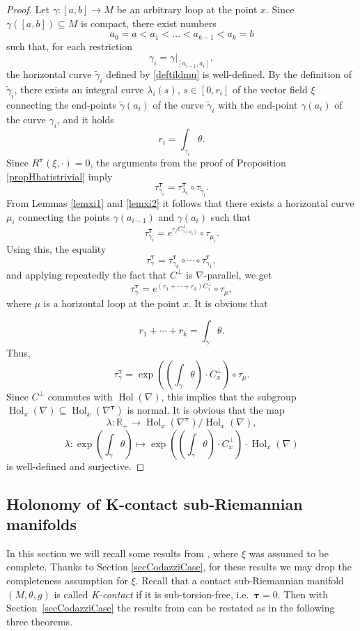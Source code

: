 \documentclass{amsart}
\theoremstyle{plain}
\theoremstyle{definition}
\newcommand{\Hol}{\operatorname{Hol}}
\newcommand{\bt}{{\boldsymbol{\tau}}}
\newcommand{\Real}{\mathbb{R}}
\newcommand{\1}{\mathbf{1}}
\newcommand{\+}{\oplus}
\newcommand{\tcom}[1]{
 \marginpar{{\scriptsize  T: #1 }}}
\newcommand{\acom}[1]{
 \marginpar{{\scriptsize A: #1 }}}
\begin{document}
\begin{proof}
Let $\gamma:[a,b]\to M$ be an arbitrary loop at the point $x$.
Since $\gamma([a,b])\subseteq M$ is compact, there exist
numbers $$a_0=a< a_1<\dots< a_{k-1}<a_k=b$$ such that,
for each restriction
$$\gamma_i=\gamma|_{[a_{i-1},a_i]},$$ the horizontal curve $\tilde \gamma_i$ defined by \eqref{deftildmu} is well-defined. 
By the definition of $\tilde\gamma_i$, there exists an integral curve $\lambda_i(s)$, $s\in [0,r_i]$ of the vector field $\xi$ connecting the end-points $\tilde\gamma(a_i)$ of the curve $\tilde\gamma_i$ with the end-point $\gamma(a_i)$ of the curve $\gamma_i$, and it holds 
$$r_i= \int_{\gamma_i}\theta.$$
Since $R^\bt(\xi,\cdot)=0$,  
the arguments from the proof of Proposition \ref{propHhatistrivial} imply
$$\tau^\bt_{\gamma_i}=\tau^\bt_{\lambda_i}\circ \tau_{\tilde\gamma_i}.$$
From Lemmas \ref{lemxi1} and \ref{lemxi2} it follows that there exists a horizontal curve $\mu_i$ connecting the points $\gamma(a_{i-1})$ and $\gamma(a_i)$ such that 
$$\tau^\bt_{\gamma_i}=e^{r_iC^\bot_{\gamma(a_i)}}\circ\tau_{\mu_i}.$$
Using this, the equality
$$\tau^\bt_\gamma=\tau^\bt_{\gamma_k}\circ\cdots\circ\tau^\bt_{\gamma_1},$$
and applying repeatedly the fact that $C^\bot$ is $\nabla$-parallel, we get 
$$\tau^\bt_\gamma=e^{(r_1+\cdots +r_k)C^\bot_x}\circ\tau_{\mu},$$
where $\mu$ is a horizontal loop at the point $x$.
It is obvious that 

$$r_1+\cdots +r_k=\int_\gamma\theta.$$
Thus, $$\tau^\bt_\gamma=\exp\left(\left(\int_\gamma\theta\right)\cdot {C^\bot_x}\right)\circ\tau_{\mu}.$$
Since
$C^\perp$ commutes with $\Hol(\nabla)$, this implies that the subgroup $\Hol_x(\nabla)\subseteq\Hol_x(\nabla^\bt)$ is normal. It is obvious that the map
$$\lambda:\Real_+\to\Hol_x(\nabla^\bt)/\Hol_x(\nabla),$$
$$\lambda:\exp\left(\int_\gamma\theta\right)\mapsto
\exp\left(\left(\int_\gamma\theta\right)\cdot {C^\bot_x}\right)\cdot \Hol_x(\nabla)$$
is well-defined and surjective. \end{proof}




\subsection{Holonomy  of K-contact sub-Riemannian manifolds}\label{secbt0}
In this section we will recall some results from \cite{GalHolK}, where $\xi$ was assumed to be complete. Thanks to Section \ref{secCodazziCase}, for these results we may drop the completeness assumption for $\xi$.
Recall that a contact sub-Riemannian manifold $(M,\theta,g)$ is called {\em K-contact} if it is sub-torsion-free, i.e.~$\bt=0$. 
Then  with Section~\ref{secCodazziCase} the results from \cite[Sections~7 and 8]{GalHolK} can be restated as in the following three theorems.
\end{document}
